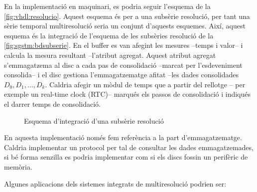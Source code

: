 En la implementació en maquinari, es podria seguir l'esquema de la
\autoref{fig:vhdl:resolucio}. Aquest esquema és per a una subsèrie
resolució, per tant una sèrie temporal multiresolució seria un conjunt
d'aquests esquemes. Així, aquest esquema és la integració de l'esquema
de les subsèries resolució de la \autoref{fig:sgstm:bdsubserie}.  En
el buffer es van afegint les mesures --temps i valor-- i calcula la
mesura resultant --l'atribut agregat. Aquest atribut agregat
s'emmagatzema al disc a cada pas de consolidació --marcat per
l'esdeveniment consolida-- i el disc gestiona l'emmagatzematge afitat
--les dades consolidades $D_0,D_1,\dotsc,D_k$. Caldria afegir un mòdul
de temps que a partir del rellotge -- per exemple un real-time clock
(RTC)-- marqués els passos de consolidació i indiqués el darrer temps
de consolidació. 





\begin{figure}[htp]
\centering

\caption{Esquema d'integració d'una subsèrie resolució}
\label{fig:vhdl:resolucio}
\end{figure}

En aquesta implementació només fem referència a la part
d'emmagatzematge.  Caldria implementar un protocol per tal de
consultar les dades emmagatzemades, si bé forma senzilla es podria
implementar com si els discs fossin un perifèric de memòria.  




Algunes aplicacions dels sistemes integrats de multiresolució podrien ser:

